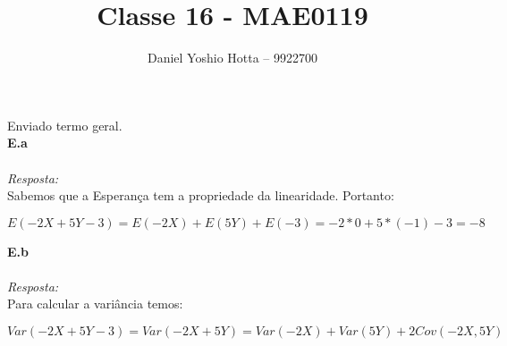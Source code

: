 \documentclass{article}
\begin{document}
	
	\title{Classe 16 - MAE0119}
	\author{Daniel Yoshio Hotta – 9922700}
	
	\maketitle	
	
	Enviado termo geral.\\
	
	\textbf {E.a} 
	\\ \\
	\textit {Resposta:} \\
    
    Sabemos que a Esperança tem a propriedade da linearidade. Portanto:
    
    \begin{center}
    	$E (-2X + 5Y - 3) = E(-2X) + E(5Y) + E(-3) = -2 * 0 + 5 * (-1) - 3 = -8$
    \end{center}

    \textbf {E.b} 
    \\ \\
    \textit {Resposta:} \\
    
    Para calcular a variância temos:
    
    \begin{center}
    	$Var (-2X + 5Y -3) = Var(-2X + 5Y) = Var (-2X) + Var(5Y) + 2Cov (-2X, 5Y)$
    \end{center}
\end{document}

